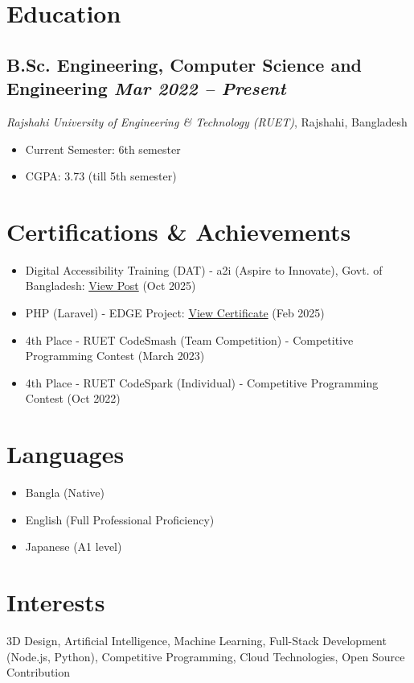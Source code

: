 \documentclass[10pt, a4paper]{article}
\newcommand{\datedsubsection}[2]{%
  \subsection*{#1 \hfill \small\textit{#2}}%
}
\newcommand{\resitem}[1]{\item #1} %
\begin{document}
\section{Education}

\datedsubsection{B.Sc. Engineering, Computer Science and Engineering}{Mar 2022 -- Present}
\textit{Rajshahi University of Engineering \& Technology (RUET)}, Rajshahi, Bangladesh
\begin{itemize}
    \resitem{Current Semester: 6th semester}
    \resitem{CGPA: 3.73 (till 5th semester)}
\end{itemize}




\section{Certifications \& Achievements}
\begin{itemize}
    \resitem{Digital Accessibility Training (DAT) - a2i (Aspire to Innovate), Govt. of Bangladesh: \href{https://www.linkedin.com/feed/update/urn:li:activity:7392734775683252224/}{View Post} (Oct 2025)}
    \resitem{PHP (Laravel) - EDGE Project: \href{https://training.edge.gov.bd/certificate-validation?certificate_no=EDGE-DSTS-116-6631-00012}{View Certificate} (Feb 2025)}
    \resitem{4th Place - RUET CodeSmash (Team Competition) - Competitive Programming Contest (March 2023)}
    \resitem{4th Place - RUET CodeSpark (Individual) - Competitive Programming Contest (Oct 2022)}
\end{itemize}

\section{Languages}
\begin{itemize}
    \resitem{Bangla (Native)}
    \resitem{English (Full Professional Proficiency)}
    \resitem{Japanese (A1 level)}
\end{itemize}

\section{Interests}
3D Design, Artificial Intelligence, Machine Learning, Full-Stack Development (Node.js, Python), Competitive Programming, Cloud Technologies, Open Source Contribution

\end{document}
